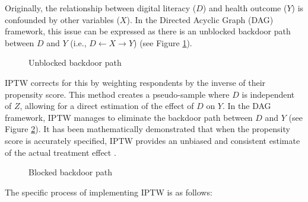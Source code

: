 Originally, the relationship between digital literacy ($D$) and health outcome ($Y$) is confounded by other variables ($X$). In the Directed Acyclic Graph (DAG) framework, this issue can be expressed as there is an unblocked backdoor path between $D$ and $Y$ (i.e., $D \leftarrow X \rightarrow Y$) (see Figure \ref{fig:backdoor}). 

\begin{figure}[h!]
    \centering
    \caption{Unblocked backdoor path}
    \label{fig:backdoor}
\end{figure}

IPTW corrects for this by weighting respondents by the inverse of their propensity score. This method creates a pseudo-sample where $D$ is independent of $Z$, allowing for a direct estimation of the effect of $D$ on $Y$. In the DAG framework, IPTW manages to eliminate the backdoor path between $D$ and $Y$ (see Figure \ref{fig:blocked}). It has been mathematically demonstrated that when the propensity score is accurately specified, IPTW provides an unbiased and consistent estimate of the actual treatment effect \parencite{lunceford_stratification_2004}.

\begin{figure}[h!]
    \centering
    \caption{Blocked backdoor path}
    \label{fig:blocked}
\end{figure}

The specific process of implementing IPTW is as follows:

